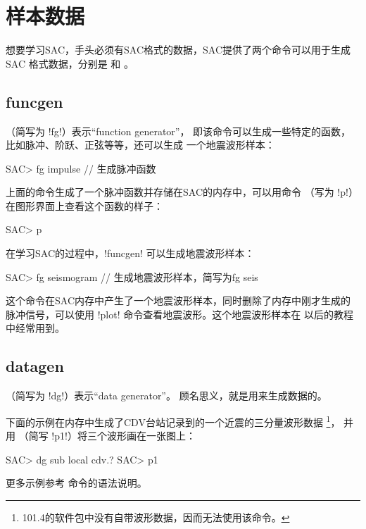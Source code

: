 \section{样本数据}
想要学习SAC，手头必须有SAC格式的数据，SAC提供了两个命令可以用于生成SAC
格式数据，分别是  和 。

\subsection{funcgen}
（简写为 !fg!）表示``function generator''，
即该命令可以生成一些特定的函数，比如脉冲、阶跃、正弦等等，还可以生成
一个地震波形样本：
\begin{SACCode}
SAC> fg impulse         // 生成脉冲函数
\end{SACCode}
上面的命令生成了一个脉冲函数并存储在SAC的内存中，可以用命令
（写为 !p!）在图形界面上查看这个函数的样子：
\begin{SACCode}
SAC> p
\end{SACCode}

在学习SAC的过程中，!funcgen! 可以生成地震波形样本：
\begin{SACCode}
SAC> fg seismogram      // 生成地震波形样本，简写为fg seis
\end{SACCode}
这个命令在SAC内存中产生了一个地震波形样本，同时删除了内存中刚才生成的
脉冲信号，可以使用 !plot! 命令查看地震波形。这个地震波形样本在
以后的教程中经常用到。

\subsection{datagen}
（简写为 !dg!）表示``data generator''。
顾名思义，就是用来生成数据的。

下面的示例在内存中生成了CDV台站记录到的一个近震的三分量波形数据
\footnote{101.4的软件包中没有自带波形数据，因而无法使用该命令。}，
并用 （简写 !p1!）将三个波形画在一张图上：
\begin{SACCode}
SAC> dg sub local cdv.?
SAC> p1
\end{SACCode}
更多示例参考  命令的语法说明。
